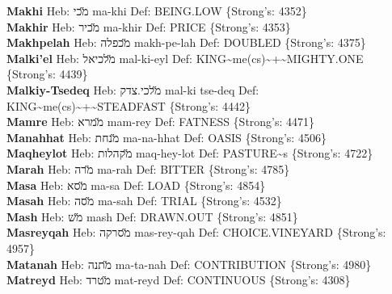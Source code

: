 {\textbf{Makhi} Heb: {\large\H מכי} ma-khi Def: BEING.LOW \{Strong's: 4352\}\hfill{}\\

\textbf{Makhir} Heb: {\large\H מכיר} ma-khir Def: PRICE \{Strong's: 4353\}\hfill{}\\

\textbf{Makhpelah} Heb: {\large\H מכפלה} makh-pe-lah Def: DOUBLED \{Strong's: 4375\}\hfill{}\\

\textbf{Malki'el} Heb: {\large\H מלכיאל} mal-ki-eyl Def: KING\textasciitilde{}me(cs)\textasciitilde{}+\textasciitilde{}MIGHTY.ONE \{Strong's: 4439\}\hfill{}\\

\textbf{Malkiy-Tsedeq} Heb: {\large\H מלכי.צדק} mal-ki tse-deq Def: KING\textasciitilde{}me(cs)\textasciitilde{}+\textasciitilde{}STEADFAST \{Strong's: 4442\}\hfill{}\\

\textbf{Mamre} Heb: {\large\H ממרא} mam-rey Def: FATNESS \{Strong's: 4471\}\hfill{}\\

\textbf{Manahhat} Heb: {\large\H מנחת} ma-na-hhat Def: OASIS \{Strong's: 4506\}\hfill{}\\

\textbf{Maqheylot} Heb: {\large\H מקהלות} maq-hey-lot Def: PASTURE\textasciitilde{}s \{Strong's: 4722\}\hfill{}\\

\textbf{Marah} Heb: {\large\H מרה} ma-rah Def: BITTER \{Strong's: 4785\}\hfill{}\\

\textbf{Masa} Heb: {\large\H מסא} ma-sa Def: LOAD \{Strong's: 4854\}\hfill{}\\

\textbf{Masah} Heb: {\large\H מסה} ma-sah Def: TRIAL \{Strong's: 4532\}\hfill{}\\

\textbf{Mash} Heb: {\large\H מש} mash Def: DRAWN.OUT \{Strong's: 4851\}\hfill{}\\

\textbf{Masreyqah} Heb: {\large\H מסרקה} mas-rey-qah Def: CHOICE.VINEYARD \{Strong's: 4957\}\hfill{}\\

\textbf{Matanah} Heb: {\large\H מתנה} ma-ta-nah Def: CONTRIBUTION \{Strong's: 4980\}\hfill{}\\

\textbf{Matreyd} Heb: {\large\H מטרד} mat-reyd Def: CONTINUOUS \{Strong's: 4308\}\hfill{}\\

}
